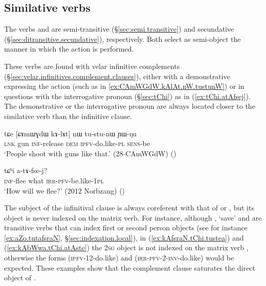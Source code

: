 \subsection{Similative verbs}  \label{sec:similative.verb.complementation}
The verbs  and   are semi-transitive (§\ref{sec:semi.transitive}) and secundative (§\ref{sec:ditransitive.secundative}), respectively. Both select as semi-object the manner in which the action is performed.

These verbs are found with velar infinitive complements (§\ref{sec:velar.infinitives.complement.clauses}), either with a demonstrative expressing the action (such as  in \ref{ex:CAmWGdW.kAlAt.nW.tustunW}) or in questions with the interrogative pronoun  (§\ref{sec:tChi}) as in (\ref{ex:tChi.atAfsej}). The demonstrative or the interrogative pronoun are always located closer to the similative verb than the infinitive clause.

\begin{exe}
\ex \label{ex:CAmWGdW.kAlAt.nW.tustunW}
 \gll tɕe [ɕɤmɯɣdɯ kɤ-lɤt] nɯ tu-stu-nɯ ɲɯ-ŋu \\
 \textsc{lnk} gun \textsc{inf}-release \textsc{dem} \textsc{ipfv}-do.like-\textsc{pl} \textsc{sens}-be \\
 \glt `People shoot with guns like that.' (28-CAmWGdW)
()
\end{exe}

 \begin{exe}
\ex \label{ex:tChi.atAfsej}
\gll  [kɤ-pʰɣo] tɕʰi a-tɤ-fse-j?    \\
\textsc{inf}-flee what \textsc{irr}-\textsc{pfv}-be.like-\textsc{1pl} \\
\glt  `How will we flee?' (2012 Norbzang)
()
\end{exe} 

The subject of the infinitival clause is always coreferent with that of  or , but its object is never indexed on the matrix verb. For instance, although , `save' and  are transitive verbs that can index first or second person objects (see for instance \ref{ex:aZo.tutafsraN}, §\ref{sec:indexation.local}), in (\ref{ex:kAfsraN.tChi.tustea}) and (\ref{ex:kAbWwa.tChi.atAste})  the \textsc{2sg} object is not indexed on the matrix verb , otherwise the forms  (\textsc{ipfv}-1\fl{}2-do.like) and  (\textsc{irr}-\textsc{pfv}-2-\textsc{inv}-do.like) would be expected. These examples show that the complement clause saturates the direct object of .

